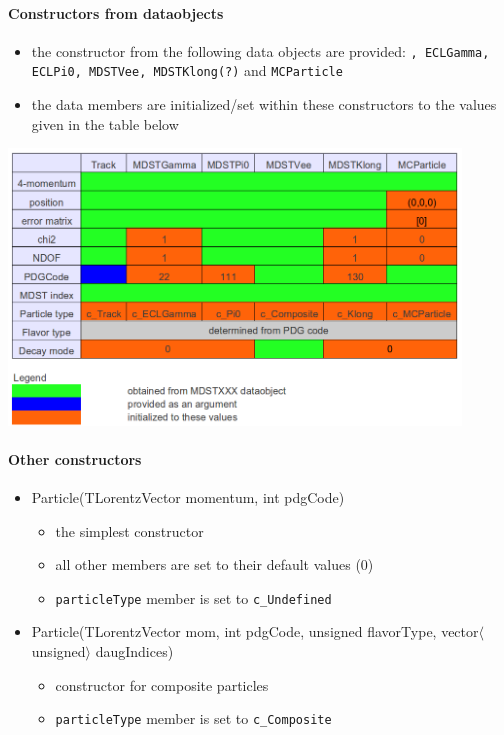 \paragraph{Constructors from \mdst dataobjects}
\begin{itemize}
 \item the \particle constructor from the following \mdst data objects are provided: {\tt \track, ECLGamma, ECLPi0, MDSTVee, MDSTKlong(?)} and {\tt MCParticle}
 \item the \particle data members are initialized/set within these constructors to the values given in the table below
\end{itemize}
\begin{center}
 \includegraphics[width=0.9\textwidth]{DataModel/figs/particleConstructorsFromMDST.png}
\end{center}

\paragraph{Other constructors}
\begin{itemize}
 \item {\bluett Particle(TLorentzVector momentum, int pdgCode)}
 \begin{itemize}
  \item the simplest constructor
  \item all other members are set to their default values (0)
  \item {\tt particleType} member is set to {\tt c\_Undefined}
 \end{itemize}
 \item {\footnotesize\bluett Particle(TLorentzVector mom, int pdgCode, unsigned flavorType, vector$\langle$unsigned$\rangle$ daugIndices)}
 \begin{itemize}
  \item constructor for composite particles
  \item {\tt particleType} member is set to {\tt c\_Composite}
 \end{itemize}
\end{itemize}


